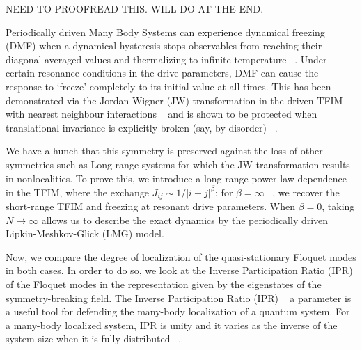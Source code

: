 \documentclass[%
 reprint,
superscriptaddress,
 amsmath,amssymb,
 aps,
prb,
]{revtex4-2}
\begin{document}
\maketitle


NEED TO PROOFREAD THIS. WILL DO AT THE END.

Periodically driven Many Body Systems can experience dynamical freezing (DMF) when a dynamical hysteresis stops observables from reaching their diagonal averaged values and thermalizing to infinite temperature ~\cite{bordia_periodically_2017, sahoo_periodically_2019, das_exotic_2010}. Under certain resonance conditions in the drive parameters, DMF can cause the response to ‘freeze’ completely to its initial value at all times. This has been demonstrated via the Jordan-Wigner (JW) transformation in the driven TFIM with nearest neighbour interactions ~\cite{mbeng_quantum_2020} and is shown to be protected when translational invariance is explicitly broken (say, by disorder) ~\cite{yamada_localization_2022, roy_fate_2015}. 

We have a hunch that this symmetry is preserved against the loss of other symmetries such as Long-range systems for which the JW transformation results in nonlocalities. To prove this, we introduce a long-range power-law dependence in the TFIM, where the exchange $J_{ij}\sim 1/|i-j|^\beta$; for $\beta=\infty$ ~\cite{campa_statistical_2009, eisele_multiple_1988, canning_class_1992}, we recover the short-range TFIM and freezing at resonant drive parameters. When $\beta=0$, taking $N\rightarrow\infty$ allows us to describe the exact dynamics by the periodically driven Lipkin-Meshkov-Glick (LMG) model.

Now, we compare the degree of localization of the quasi-stationary Floquet modes in both cases. In order to do so, we look at the Inverse Participation Ratio (IPR) of the Floquet modes in the representation given by the eigenstates of the symmetry-breaking field. The Inverse Participation Ratio (IPR) ~\cite{murphy_generalized_2011} a parameter is a useful tool for defending the many-body localization of a quantum system. For a many-body localized system, IPR is unity and it varies as the inverse of the system size when it is fully distributed ~\cite{calixto_inverse_2015}.
\end{document}
